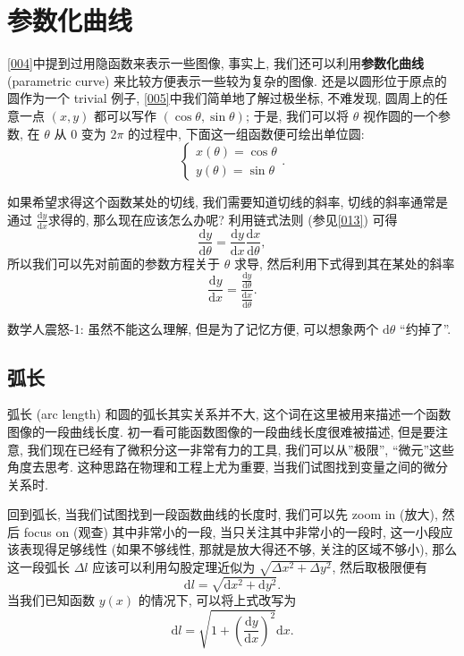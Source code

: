 \section{参数化曲线}\label{021}

\ref{004}中提到过用隐函数来表示一些图像, 事实上,
我们还可以利用\textbf{参数化曲线} (parametric curve)
来比较方便表示一些较为复杂的图像. 还是以圆形位于原点的圆作为一个 trivial
例子, \ref{005}中我们简单地了解过极坐标, 不难发现, 圆周上的任意一点
\((x,y)\) 都可以写作 \((\cos\theta, \sin\theta)\); 于是, 我们可以将
\(\theta\) 视作圆的一个参数, 在 \(\theta\) 从 \(0\) 变为 \(2\pi\)
的过程中, 下面这一组函数便可绘出单位圆: \[
\begin{cases}
x(\theta)=\cos\theta\\
y(\theta)=\sin\theta
\end{cases}.
\]

如果希望求得这个函数某处的切线, 我们需要知道切线的斜率,
切线的斜率通常是通过 \(\frac{\mathrm{d}y}{\mathrm{d}x}\)求得的,
那么现在应该怎么办呢? 利用链式法则 (参见\ref{013}) 可得 \[
\frac{\mathrm{d}y}{\mathrm{d}\theta}=\frac{\mathrm{d}y}{\mathrm{d}x}\frac{\mathrm{d}x}{\mathrm{d}\theta},
\] 所以我们可以先对前面的参数方程关于 \(\theta\) 求导,
然后利用下式得到其在某处的斜率 \[
\frac{\mathrm{d}y}{\mathrm{d}x}=\frac{\frac{\mathrm{d}y}{\mathrm{d}\theta}}{\frac{\mathrm{d}x}{\mathrm{d}\theta}}.
\]

\begin{newquote}
数学人震怒-1: 虽然不能这么理解, 但是为了记忆方便, 可以想象两个
\(\mathrm{d}\theta\) ``约掉了''.
\end{newquote}

\subsection{弧长}

弧长 (arc length) 和圆的弧长其实关系并不大,
这个词在这里被用来描述一个函数图像的一段曲线长度.
初一看可能函数图像的一段曲线长度很难被描述, 但是要注意,
我们现在已经有了微积分这一非常有力的工具, 我们可以从''极限'',
``微元''这些角度去思考. 这种思路在物理和工程上尤为重要,
当我们试图找到变量之间的微分关系时.

回到弧长, 当我们试图找到一段函数曲线的长度时, 我们可以先 zoom in (放大),
然后 focus on (观查) 其中非常小的一段, 当只关注其中非常小的一段时,
这一小段应该表现得足够线性 (如果不够线性, 那就是放大得还不够,
关注的区域不够小), 那么这一段弧长 \(\Delta l\)
应该可以利用勾股定理近似为 \(\sqrt{\Delta x^2+\Delta y^2}\),
然后取极限便有 \[
\boxed{\mathrm{d}l=\sqrt{\mathrm{d}x^2+\mathrm{d}y^2}}.
\] 当我们已知函数 \(y(x)\) 的情况下, 可以将上式改写为 \[
\mathrm{d}l=\sqrt{1+\left(\frac{\mathrm{d}y}{\mathrm{d}x}\right)^2}\mathrm{d}x.
\]

